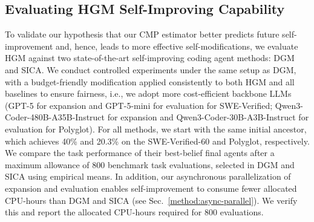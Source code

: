 \documentclass{article} %
\begin{document}
\subsection{Evaluating HGM Self-Improving Capability}
\label{exp:eval-self-improv}
To validate our hypothesis that our $\mathrm{CMP}$ estimator better predicts future self-improvement and, hence, leads to more effective self-modifications, we evaluate HGM against two state-of-the-art self-improving coding agent methods: DGM and SICA. We conduct controlled experiments under the same setup as DGM, with a budget-friendly modification applied consistently to both HGM and all baselines to ensure fairness, i.e., we adopt more cost-efficient backbone LLMs (GPT-5 for expansion and GPT-5-mini for evaluation for SWE-Verified; Qwen3-Coder-480B-A35B-Instruct for expansion and Qwen3-Coder-30B-A3B-Instruct for evaluation for Polyglot). For all methods, we start with the same initial ancestor, which achieves 40\% and 20.3\% on the SWE-Verified-60 and Polyglot, respectively. 
We compare the task performance of their best-belief final agents after a maximum allowance of 800 benchmark task evaluations, selected in DGM and SICA using empirical means.
In addition, our asynchronous parallelization of expansion and evaluation enables self-improvement to consume fewer allocated CPU-hours than DGM and SICA (see Sec.~\ref{method:async-parallel}). We verify this and report the allocated CPU-hours required for 800 evaluations.
\end{document}
